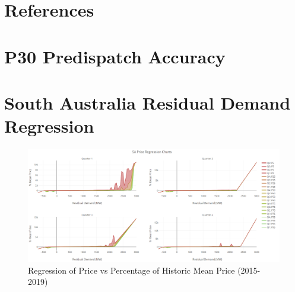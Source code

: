 \documentclass[11pt,fleqn]{book} %
\let\cleardoublepage\clearpage
\begin{document}
\pagestyle{empty} %

\tableofcontents %
\listoffigures


\pagestyle{fancy} %

% 







\chapter*{References}
\printbibliography[heading=none]
\appendix
{} %
\chapter{ P30 Predispatch Accuracy}

\chapter{ South Australia Residual Demand Regression}
\begin{figure}[H]
    \centering
    \includegraphics[width=\textwidth]{Pictures/sa_regression.png}
    \caption{Regression of Price vs Percentage of Historic Mean Price (2015-2019)}
    \label{fig:regression}
\end{figure}
 
\end{document}
